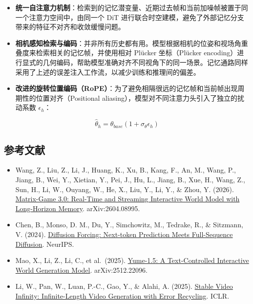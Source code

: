 \begin{itemize}
\tightlist
\item
  \textbf{统一自注意力机制}：检索到的记忆潜变量、近期过去帧和当前加噪帧被置于同一个注意力空间中，由同一个 DiT 进行联合时空建模，避免了外部记忆分支带来的特征不对齐和收敛缓慢问题。
\item
  \textbf{相机感知检索与编码}：并非所有历史都有用。模型根据相机的位姿和视场角重叠度来检索相关的记忆帧，并使用相对 Plücker 坐标（Plücker encoding）进行显式的几何编码，帮助模型准确对齐不同视角下的同一场景。记忆通路同样采用了上述的误差注入工作流，以减少训练和推理间的偏差。
\item
{}
  \textbf{改进的旋转位置编码（RoPE）}：为了避免相隔很远的记忆帧和当前帧出现周期性的位置对齐（Positional aliasing），模型对不同注意力头引入了独立的扰动系数 \(\epsilon_h\)：
\end{itemize}

\[
\hat{\theta}_h = \theta_{base}(1 + \sigma_{\theta}\epsilon_h)
\]

\FloatBarrier
{}
\hypertarget{ux53c2ux8003ux6587ux732e-144}{%
\subsection{参考文献}\label{ux53c2ux8003ux6587ux732e-144}}

\vspace{0.25em}
\begin{itemize}
\tightlist
\item
  Wang, Z., Liu, Z., Li, J., Huang, K., Xu, B., Kang, F., An, M., Wang, P., Jiang, B., Wei, Y., Xietian, Y., Pei, J., Hu, L., Jiang, B., Xue, H., Wang, Z., Sun, H., Li, W., Ouyang, W., He, X., Liu, Y., Li, Y., \& Zhou, Y. (2026). \href{https://arxiv.org/abs/2604.08995}{Matrix-Game 3.0: Real-Time and Streaming Interactive World Model with Long-Horizon Memory}. arXiv:2604.08995.
\item
  Chen, B., Monso, D. M., Du, Y., Simchowitz, M., Tedrake, R., \& Sitzmann, V. (2024). \href{https://arxiv.org/abs/2407.01392}{Diffusion Forcing: Next-token Prediction Meets Full-Sequence Diffusion}. NeurIPS.
\item
  Mao, X., Li, Z., Li, C., et al.~(2025). \href{https://arxiv.org/abs/2512.22096}{Yume-1.5: A Text-Controlled Interactive World Generation Model}. arXiv:2512.22096.
\item
  Li, W., Pan, W., Luan, P.-C., Gao, Y., \& Alahi, A. (2025). \href{https://arxiv.org/abs/2510.09212}{Stable Video Infinity: Infinite-Length Video Generation with Error Recycling}. ICLR.
\end{itemize}

\clearpage
